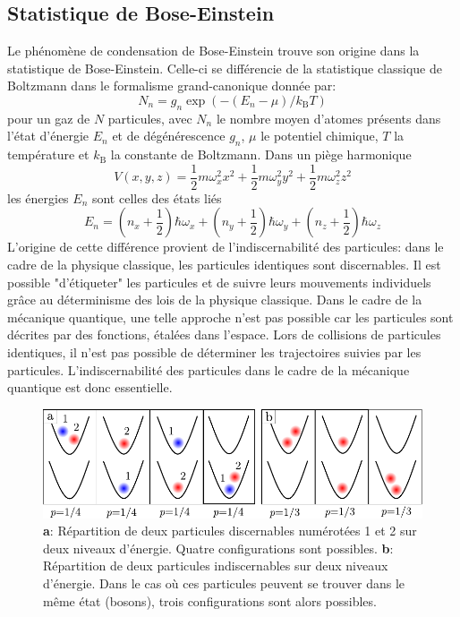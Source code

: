 \subsection{Statistique de Bose-Einstein}
Le phénomène de condensation de Bose-Einstein trouve son origine dans la statistique de Bose-Einstein. Celle-ci se différencie de la statistique classique de Boltzmann dans le formalisme grand-canonique donnée par:
\begin{equation}
N_n=g_n \exp{\left( -(E_n-\mu)/k_{\mathrm{B}}T \right)}
\end{equation}
pour un gaz de $N$ particules, avec $N_n$ le nombre moyen d'atomes présents dans l'état d'énergie $E_n$ et de dégénérescence $g_n$, $\mu$ le potentiel chimique, $T$ la température et $k_{\mathrm{B}}$ la constante de Boltzmann. Dans un piège harmonique
\begin{equation}
V(x,y,z)=\frac{1}{2}m \omega_x^2 x^2 + \frac{1}{2}m \omega_y^2 y^2 + \frac{1}{2}m \omega_z^2 z^2
\end{equation}
les énergies $E_n$ sont celles des états liés
\begin{equation}
E_n=(n_x+\frac{1}{2}) \hbar \omega_x + (n_y+\frac{1}{2}) \hbar \omega_y + (n_z+\frac{1}{2}) \hbar \omega_z
\end{equation}
L'origine de cette différence provient de l'indiscernabilité des particules: dans le cadre de la physique classique, les particules identiques sont discernables. Il est possible "d'étiqueter" les particules et de suivre leurs mouvements individuels grâce au déterminisme des lois de la physique classique.
Dans le cadre de la mécanique quantique, une telle approche n'est pas possible car les particules sont décrites par des fonctions, étalées dans l'espace. Lors de collisions de particules identiques, il n'est pas possible de déterminer les trajectoires suivies par les particules. L'indiscernabilité des particules dans le cadre de la mécanique quantique est donc essentielle.

\begin{figure}
\centering
\includegraphics[width=\textwidth]{Fig/BEC_manip/stat_bose.pdf}
\caption{\textbf{a}: Répartition de deux particules discernables numérotées 1 et 2 sur deux niveaux d'énergie. Quatre configurations sont possibles. \textbf{b}: Répartition de deux particules indiscernables sur deux niveaux d'énergie. Dans le cas où ces particules peuvent se trouver dans le même état (bosons), trois configurations sont alors possibles.}
\label{fig:stat_bose}
\end{figure}


